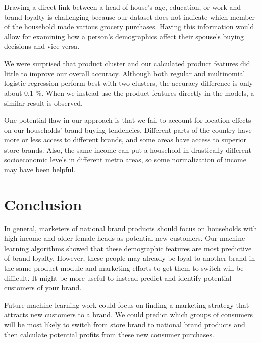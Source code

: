 \documentclass[conference]{IEEEtran}
\begin{document}
Drawing a direct link between a head of house's age, education, or work and brand loyalty is challenging because our dataset does not indicate which member of the household made various grocery purchases. Having this information would allow for examining how a person's demographics affect their spouse's buying decisions and vice versa.


We were surprised that product cluster and our calculated product features did little to improve our overall accuracy. Although both regular and multinomial logistic regression perform best with two clusters, the accuracy difference is only about 0.1 \%. When we instead use the product features directly in the models, a similar result is observed.


One potential flaw in our approach is that we fail to account for location effects on our households' brand-buying tendencies. Different parts of the country have more or less access to different brands, and some areas have access to superior store brands\cite{bronnenberg2016formation}. Also, the same income can put a household in drastically different socioeconomic levels in different metro areas, so some normalization of income may have been helpful. 


\section{Conclusion}
In general, marketers of national brand products should focus on households with high income and older female heads as potential new customers. Our machine learning algorithms showed that these demographic features are most predictive of brand loyalty. However, these people may already be loyal to another brand in the same product module and marketing efforts to get them to switch will be difficult. It might be more useful to instead predict and identify potential customers of your brand.


Future machine learning work could focus on finding a marketing strategy that attracts new customers to a brand. We could predict which groups of consumers will be most likely to switch from store brand to national brand products and then calculate potential profits from these new consumer purchases. 






\end{document}
